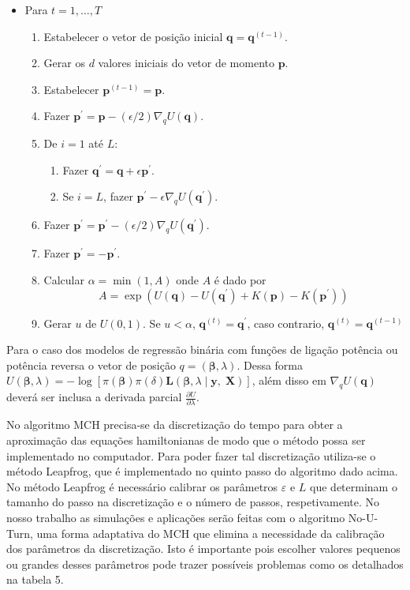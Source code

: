\begin{itemize}
	\item Para $t=1,\ldots,T$	
	\begin{enumerate}
		\item Estabelecer o vetor de posição inicial $\bm{q}=\bm{q}^{(t-1)}$.	
		\item Gerar os $d$ valores iniciais do vetor de momento $\bm{p}$.
		\item Estabelecer $\bm{p}^{(t-1)}=\bm{p}$.
		\item Fazer $\bm{p}^{'}=\bm{p}-(\epsilon/2)\nabla_{q}U\left(\bm{q}\right)$.
		\item De $i=1$ até $L$:
		\begin{enumerate}
			\item Fazer $\bm{q}^{'}=\bm{q}+\epsilon\bm{p}^{'}$.
			\item Se $i=L$, fazer $\bm{p}^{'}-\epsilon\nabla_{q}U\left(\bm{q^{'}}\right)$.
		\end{enumerate}
		\item Fazer $\bm{p}^{'}=\bm{p}^{'}-(\epsilon/2)\nabla_{q}U\left(\bm{q}^{'}\right)$.
		\item Fazer $\bm{p}^{'}=\bm{-p}^{'}$.
		\item Calcular $\alpha=\min\left(1,A\right)$ onde $A$ é dado por
		$$A=\exp\left(U\left(\bm{q}\right)-U\left(\bm{q}^{'}\right)+K\left(\bm{p}\right)-K\left(\bm{p}^{'}\right)\right)$$
		\item Gerar $u$ de $U(0,1)$. Se $u<\alpha$, $\bm{q}^{(t)}=\bm{q}^{'}$, caso contrario, $\bm{q}^{(t)}=\bm{q}^{(t-1)}$
	\end{enumerate}
\end{itemize}

\noindent Para o caso dos modelos de regressão binária com funções de ligação potência ou potência reversa o vetor de posição $q=\left(\bm{\beta},\lambda \right)$. Dessa forma $U\left(\boldsymbol{\beta},\lambda\right)=-\log\left[\pi\left(\boldsymbol{\beta}\right)\pi\left(\delta\right)\mathbf{L}\left(\boldsymbol{\beta},\lambda\mid\mathbf{y},\;\mathbf{X}\right)\right]$, além disso em $\nabla_{q}U\left(\bm{q}\right)$ deverá ser inclusa a derivada parcial $\frac{\partial U}{\partial\lambda}$.

No algoritmo MCH precisa-se da discretização do tempo para obter a aproximação das equações hamiltonianas de modo que o método possa ser implementado no computador. Para poder fazer tal discretização utiliza-se o método Leapfrog, que é implementado no quinto passo do algoritmo dado acima. No método Leapfrog é necessário calibrar os parâmetros $\varepsilon$ e $L$ que determinam o tamanho do passo na discretização e o número de passos, respetivamente. No nosso trabalho as simulações e aplicações serão feitas com o algoritmo No-U-Turn, uma forma adaptativa do MCH que elimina a necessidade da calibração dos parâmetros da discretização. Isto é importante pois escolher valores pequenos ou grandes desses parâmetros pode trazer possíveis problemas como os detalhados na tabela 5. 
